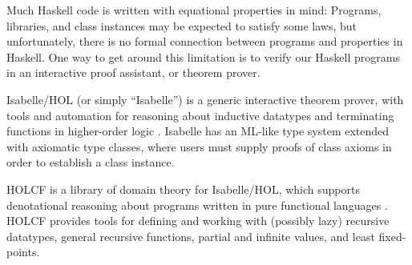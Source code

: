 \documentclass{sigplanconf}
\newcommand{\hsc}[1]{\ensuremath{\mathit{#1}}}
\newcommand{\tA}{\alpha}
\theoremstyle{definition}
\begin{document}

Much Haskell code is written with equational properties in mind: Programs, libraries, and class instances may be expected to satisfy some laws, but unfortunately, there is no formal connection between programs and properties in Haskell.
One way to get around this limitation is to verify our Haskell programs in an interactive proof assistant, or theorem prover.


Isabelle/HOL (or simply ``Isabelle'') is a generic interactive theorem prover, with tools and automation for reasoning about inductive datatypes and terminating functions in higher-order logic \cite{isabelle-tutorial}. Isabelle has an ML-like type system extended with axiomatic type classes, where users must supply proofs of class axioms in order to establish a class instance.


HOLCF is a library of domain theory for Isabelle/HOL, which supports denotational reasoning about programs written in pure functional languages \cite{holcf99,holcf11}.
HOLCF provides tools for defining and working with (possibly lazy) recursive datatypes, general recursive functions, partial and infinite values, and least fixed-points.
\end{document}
